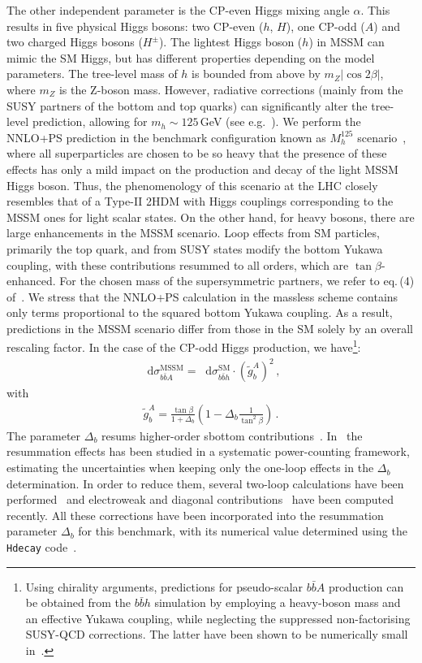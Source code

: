 \documentclass[11pt,a4paper]{article}
\newcommand{\dd}{\mathop{}\!\mathrm{d}}
\begin{document}
The other independent parameter is the CP-even Higgs mixing angle $\alpha$. This results in five physical Higgs bosons: two CP-even ($h$, $H$), one CP-odd ($A$) and two charged Higgs bosons ($H^{\pm}$). The lightest Higgs boson ($h$) in MSSM can mimic the SM Higgs, but has different properties depending on the model parameters. The tree-level mass of $h$ is bounded from above by $m_Z |\cos 2\beta|$, where $m_Z$ is the Z-boson mass. However, radiative corrections (mainly from the SUSY partners of the bottom and top quarks) can significantly alter the tree-level prediction, allowing for $m_h\sim 125$\,GeV (see e.g.~\cite{Slavich:2020zjv}). We perform the NNLO+PS prediction in the benchmark configuration known as $M_h^{125}$ scenario~\cite{Bagnaschi:2018ofa}, where all superparticles are chosen to be so heavy that the presence of these effects has only a mild impact on the production and decay of the light MSSM Higgs boson. Thus, the phenomenology of this scenario at the LHC closely resembles that of a Type-II 2HDM with Higgs couplings corresponding to the MSSM ones for light scalar states. On the other hand, for heavy bosons, there are large enhancements in the MSSM scenario. Loop effects from SM particles, primarily the top quark, and from SUSY states modify the bottom Yukawa coupling, with these contributions resummed to all orders, which are $\tan\beta$-enhanced. For the chosen mass of the supersymmetric partners, we refer to eq.\,(4) of~. We stress that the NNLO+PS calculation in the massless scheme contains only terms proportional to the squared bottom Yukawa coupling. As a result, \bbH{} predictions in the MSSM scenario differ from those in the SM solely by an overall rescaling factor. In the case of the CP-odd Higgs production, we have\footnote{Using chirality arguments, predictions for pseudo-scalar $b\bar bA$ production can be obtained from the $b\bar b h$ simulation by employing a heavy-boson mass and an effective Yukawa coupling, while neglecting the suppressed non-factorising SUSY-QCD corrections. The latter have been shown to be numerically small in~.}:
\begin{align}
	\dd \sigma_{b\bar b A}^{\text{MSSM}} = \dd \sigma_{b\bar b h}^{\text{SM}} \cdot (\tilde g_b^{A})^2\,,	\label{eq:BSMYuk}
\end{align}
with
\begin{align}
	\tilde{g}_b^A = \frac{\tan \beta}{1 + \Delta_b} \left( 1 - \Delta_b \frac{1}{\tan^2\beta} \right)\,.
\end{align}
The parameter $ \Delta_b $ resums higher-order sbottom contributions~\cite{Banks:1987iu,Hall:1993gn,Carena:1994bv,Carena:2000uj,Guasch:2003cv}. In~ the resummation effects has been studied in a systematic power-counting framework, estimating the uncertainties when keeping only the one-loop effects in the $ \Delta_b $ determination. In order to reduce them, several two-loop calculations have been performed~\cite{Noth:2008tw,Noth:2010jy,Mihaila:2010mp,Crivellin:2012zz} and electroweak and diagonal contributions~\cite{Ghezzi:2017enb} have been computed recently.  All these corrections have been incorporated into the resummation parameter $ \Delta_b $ for this benchmark, with its numerical value determined using the \texttt{Hdecay} code~\cite{Djouadi:1997yw,Djouadi:2018xqq}. 
\end{document}
